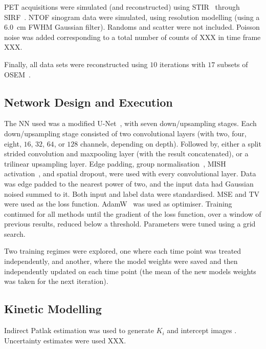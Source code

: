         \gls{PET} acquisitions were simulated (and reconstructed) using \gls{STIR}~\cite{Thielemans2012} through \gls{SIRF}~\cite{Ovtchinnikov2017}. \gls{NTOF} sinogram data were simulated, using resolution modelling (using a \SI{6.0}{\centi\meter} \gls{FWHM} Gaussian filter). Randoms and scatter were not included. Poisson noise was added corresponding to a total number of counts of XXX in time frame XXX.

        Finally, all data sets were reconstructed using $10$ iterations with $17$ subsets of \gls{OSEM}~\cite{Hudson1994}.

    
    \subsection{Network Design and Execution} \label{sec:network_design_and_execution}
        The \gls{NN} used was a modified U-Net~\cite{Weng2015U-Net:Segmentation}, with seven down/upsampling stages. Each down/upsampling stage consisted of two convolutional layers (with two, four, eight, $16$, $32$, $64$, or $128$ channels, depending on depth). Followed by, either a split strided convolution and maxpooling layer (with the result concatenated), or a trilinear upsampling layer. Edge padding, group normalisation~\cite{Wu2018GroupNormalization}, MISH activation~\cite{Misra2020Mish:Function}, and spatial dropout, were used with every convolutional layer. Data was edge padded to the nearest power of two, and the input data had Gaussian noised summed to it. Both input and label data were standardised. \gls{MSE} and \gls{TV} were used as the loss function. AdamW~\cite{Loshchilov2017DecoupledRegularization} was used as optimiser. Training continued for all methods until the gradient of the loss function, over a window of previous results, reduced below a threshold. Parameters were tuned using a grid search.
        
        Two training regimes were explored, one where each time point was treated independently, and another, where the model weights were saved and then independently updated on each time point (the mean of the new models weights was taken for the next iteration).
        
    
    \subsection{Kinetic Modelling} \label{sec:kinetic_modelling}
        Indirect Patlak estimation was used to generate $K_i$ and intercept images \cite{patlak1983GraphicalEvaluationBloodtoBrain}. Uncertainty estimates were used XXX.
        

